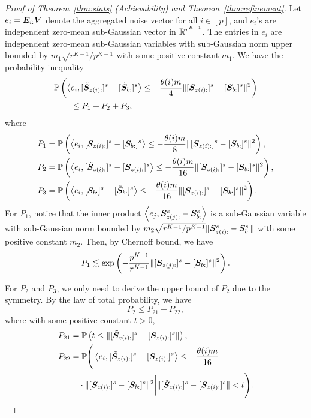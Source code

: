 \documentclass[journal]{IEEEtran}
\theoremstyle{definition}
\theoremstyle{definition}
\newcommand{\of}[1]{\left(#1\right)}
\newcommand{\ang}[1]{\left\langle#1\right\rangle}
\begin{document}
\begin{proof}[Proof of Theorem~\ref{thm:stats} (Achievability) and Theorem~\ref{thm:refinement}]
    Let $e_i = \bm{E}_{i:} \bm{V}$ denote the aggregated noise vector for all $i \in [p]$, and $e_i$'s are independent zero-mean sub-Gaussian vector in $\mathbb{R}^{r^{K-1}}$. The entries in $e_i$ are independent zero-mean sub-Gaussian variables with sub-Gaussian norm upper bounded by $m_1\sqrt{r^{K-1}/p^{K-1}}$ with some positive constant $m_1$. We have the probability inequality
    \begin{align}
        &\bbP \of{ \ang{ e_i, [  \tilde \mS_{z(i):} ]^s - [  \tilde \mS_{b:} ]^s } \leq - \frac{ \theta(i) m}{4} \onormSize{}{ [ \mS_{z(i):}  ]^s - [ \mS_{b:}  ]^s  }^2}\\
        &\quad \quad \leq P_1 + P_2 + P_3,
    \end{align}
    where 
    \small
    \begin{align}
        P_1 &= \bbP \of{ \ang{e_i, [  \mS_{z(i):} ]^s - [ \mS_{b:} ]^s} \leq -\frac{\theta(i)m}{8}  \onormSize{}{ [ \mS_{z(i):}  ]^s - [ \mS_{b:}  ]^s  }^2 }, \\
        P_2 &= \bbP \of{ \ang{e_i, [ \tilde  \mS_{z(i):} ]^s - [ \mS_{z(i):} ]^s} \leq -\frac{\theta(i)m}{16}  \onormSize{}{ [ \mS_{z(i):}  ]^s - [ \mS_{b:}  ]^s  }^2 },\\
        P_3 &= \bbP \of{ \ang{e_i, [  \mS_{b:} ]^s - [\tilde  \mS_{b:} ]^s} \leq -\frac{\theta(i)m}{16}   \onormSize{}{ [ \mS_{z(i):}  ]^s - [ \mS_{b:}  ]^s  }^2 }.
    \end{align}
    \normalsize
    For $P_1$, notice that the inner product $\ang{e_j,\mS_{z(j):}^s - \mS_{b:}^s} $ is a sub-Gaussian variable with sub-Gaussian norm bounded by $m_2 \sqrt{ r^{K-1}/ p^{K-1} } \lVert \bm S_{z(i):}^s -  \bm S_{b:}^s \rVert$ with some positive constant $m_2$. Then, by Chernoff bound, we have  
    \begin{equation}\label{eq:p1_2}
         P_1 \lesssim \exp \of{  - \frac{p^{K-1}}{r^{K-1}}   \onormSize{}{ [ \mS_{z(j):}  ]^s - [ \mS_{b:}  ]^s  }^2 }.
    \end{equation}
    
    For $P_2$ and $P_3$, we only need to derive the upper bound of $P_2$ due to the symmetry. By the law of total probability, we have 
    \begin{equation}\label{eq:p2}
        P_2 \leq P_{21} + P_{22},
    \end{equation}
    where with some positive constant $t>0$,
    \begin{align}
        P_{21}& =  \bbP \of{ t \leq   \onormSize{}{ [ \tilde  \mS_{z(i):} ]^s - [ \mS_{z(i):} ]^s }},\\
        P_{22} &= \bbP \Bigg(  \ang{e_i, [ \tilde  \mS_{z(i):} ]^s - [ \mS_{z(i):} ]^s} \leq -\frac{\theta(i)m}{16} \\
        &\quad \cdot \onormSize{}{ [ \mS_{z(i):}  ]^s - [ \mS_{b:}  ]^s  }^2   \bigg| \onormSize{}{ [ \tilde  \mS_{z(i):} ]^s - [ \mS_{z(i):} ]^s } < t  \Bigg).
    \end{align}
    

\end{proof}
\end{document}
